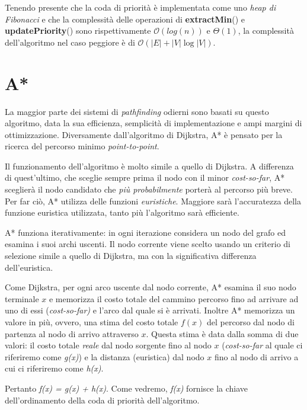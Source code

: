 \documentclass[12pt]{book}
\begin{document}
\par{
Tenendo presente che la coda di priorit\`a \`e implementata come uno \emph{heap di Fibonacci} e che la complessit\`a delle operazioni di \textbf{extractMin}() e \textbf{updatePriority}() sono rispettivamente $\mathcal{O}(log(n))$ e $\Theta(1)$, la complessit\`a dell'algoritmo nel caso peggiore \`e di $\mathcal{O}(|E| + |V| \log|V|)$.
}
\section{A*}
\label{sec:astar}
La maggior parte dei sistemi di \emph{pathfinding} odierni sono basati su questo algoritmo, data la sua efficienza, semplicit\`a di implementazione e ampi margini di ottimizzazione.
Diversamente dall'algoritmo di Dijkstra, A* \`e pensato per la ricerca del percorso minimo \emph{point-to-point}.
\par{
Il funzionamento dell'algoritmo \`e molto simile a quello di Dijkstra. A differenza di quest'ultimo, che sceglie sempre prima il nodo con il minor \emph{cost-so-far}, A* sceglier\`a il nodo candidato che \emph{pi\`u probabilmente} porter\`a al percorso pi\`u breve. Per far ci\`o, A* utilizza delle funzioni \emph{euristiche}. Maggiore sar\`a l'accuratezza della funzione euristica utilizzata, tanto pi\`u l'algoritmo sar\`a efficiente.
}
\par{
A* funziona iterativamente: in ogni iterazione considera un nodo del grafo ed esamina i suoi archi uscenti. Il nodo corrente viene scelto usando un criterio di selezione simile a quello di Dijkstra, ma con la significativa differenza dell'euristica.
}
\par{
Come Dijkstra, per ogni arco uscente dal nodo corrente, A* esamina il suo nodo terminale $x$ e memorizza il costo totale del cammino percorso fino ad arrivare ad uno di essi (\emph{cost-so-far)} e l'arco dal quale si \`e arrivati. Inoltre A* memorizza un valore in pi\`u, ovvero, una stima del costo totale $f(x)$ del percorso dal nodo di partenza al nodo di arrivo attraverso $x$. Questa stima \`e data dalla somma di due valori: il costo totale \emph{reale} dal nodo sorgente fino al nodo $x$ (\emph{cost-so-far} al quale ci riferiremo come \emph{g(x)}) e la distanza (euristica) dal nodo $x$ fino al nodo di arrivo a cui ci riferiremo come \emph{h(x)}.
}
\par{
Pertanto \emph{f(x) = g(x) + h(x)}. Come vedremo, \emph{f(x)} fornisce la chiave dell'ordinamento della coda di priorit\`a dell'algoritmo}.
\end{document}
